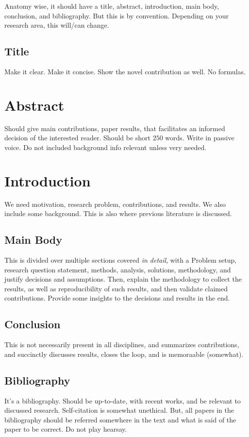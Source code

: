 \documentclass[10pt, oneside]{article}
\begin{document}
Anatomy wise, it should have a title, abstract, introduction, main body, conclusion, and bibliography. But this is by convention. Depending on your research area, this will/can change. 

\subsection{Title}
Make it clear. Make it concise. Show the novel contribution as well. 
No formulas. 
\section{Abstract}
Should give main contributions, paper results, that facilitates an informed decision of the interested reader. Should be short $250$ words. Write in passive voice. Do not included background info relevant unless very needed. 

\section{Introduction}
We need motivation, research problem, contributions, and results. We also include some background. This is also where previous literature is discussed. 
\subsection{Main Body}
This is divided over multiple sections covered \textit{in detail}, with a Problem setup, research question statement, methods, analysis, solutions, methodology, and justify decisions and assumptions. Then, explain the methodology to collect the results, as well as reproducibility of such results, and then validate claimed contributions. Provide some insights to the decisions and results in the end. 
\subsection{Conclusion}
This is not necessarily present in all disciplines, and summarizes contributions, and succinctly discusses results, closes the loop, and is memoraable (somewhat).
\subsection{Bibliography}
It's a bibliography. Should be up-to-date, with recent works, and be relevant to discussed research. Self-citation is somewhat unethical. But, all papers in the bibliography should be referred somewhere in the text and what is said of the paper to be correct. Do not play hearsay. 
\end{document}
